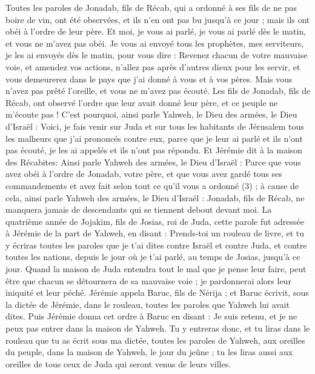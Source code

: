 \begin{multicols}{2}
Toutes les paroles de Jonadab, fils de Récab, qui a ordonné à ses fils de ne pas boire de vin, ont été observées, et ils n'en ont pas bu jusqu’à ce jour ; mais ils ont obéi à l’ordre de leur père. Et moi, je vous ai parlé, je vous ai parlé dès le matin, et vous ne m'avez pas obéi.
Je vous ai envoyé tous les prophètes, mes serviteurs, je les ai envoyés dès le matin, pour vous dire : Revenez chacun de votre mauvaise voie, et amendez vos actions, n’allez pas après d'autres dieux pour les servir, et vous demeurerez dans le pays que j'ai donné à vous et à vos pères. Mais vous n'avez pas prêté l’oreille, et vous ne m'avez pas écouté.
Les fils de Jonadab, fils de Récab, ont observé l’ordre que leur avait donné leur père, et ce peuple ne m'écoute pas !
C’est pourquoi, ainsi parle Yahweh, le Dieu des armées, le Dieu d'Israël : Voici, je fais venir sur Juda et sur tous les habitants de Jérusalem tous les malheurs que j'ai prononcés contre eux, parce que je leur ai parlé et ils n'ont pas écouté, je les ai appelés et ils n'ont pas répondu.
Et Jérémie dit à la maison des Récabites: Ainsi parle Yahweh des armées, le Dieu d'Israël : Parce que vous avez obéi à l’ordre de Jonadab, votre père, et que vous avez gardé tous ses commandements et avez fait selon tout ce qu'il vous a ordonné\FTNT{} (3) ;
à cause de cela, ainsi parle Yahweh des armées, le Dieu d'Israël : Jonadab, fils de Récab, ne manquera jamais de descendants qui se tiennent debout devant moi.
\VerseOne{}La quatrième année de Jojakim, fils de Josias, roi de Juda, cette parole fut adressée à Jérémie de la part de Yahweh, en disant :
Prends-toi un rouleau de livre, et tu y écriras toutes les paroles que je t’ai dites contre Israël et contre Juda, et contre toutes les nations, depuis le jour où je t'ai parlé, au temps de Josias, jusqu’à ce jour.
Quand la maison de Juda entendra tout le mal que je pense leur faire, peut être que chacun se détournera de sa mauvaise voie ; je pardonnerai alors leur iniquité et leur péché.
Jérémie appela Baruc, fils de Nérija ; et Baruc écrivit, sous la dictée de Jérémie, dans le rouleau, toutes les paroles que Yahweh lui avait dites.
Puis Jérémie donna cet ordre à Baruc en disant : Je suis retenu, et je ne peux pas entrer dans la maison de Yahweh.
Tu y entreras donc, et tu liras dans le rouleau que tu as écrit sous ma dictée, toutes les paroles de Yahweh, aux oreilles du peuple, dans la maison de Yahweh, le jour du jeûne ; tu les liras aussi aux oreilles de tous ceux de Juda qui seront venus de leurs villes.

\end{multicols}
